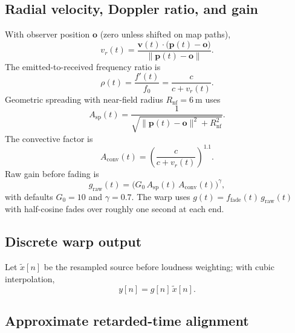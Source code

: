\documentclass{article}
\begin{document}
\subsection{Radial velocity, Doppler ratio, and gain}
\label{supp:radial-doppler-gain}

With observer position $\mathbf{o}$ (zero unless shifted on map paths),
\begin{equation}
  v_r(t) = \frac{\mathbf{v}(t)\cdot\bigl(\mathbf{p}(t)-\mathbf{o}\bigr)}{\bigl\|\mathbf{p}(t)-\mathbf{o}\bigr\|}.
\end{equation}
The emitted-to-received frequency ratio is
\begin{equation}
  \rho(t) = \frac{f'(t)}{f_0} = \frac{c}{c + v_r(t)}.
  \label{eq:doppler-ratio-main}
\end{equation}
Geometric spreading with near-field radius $R_{\mathrm{nf}}=\SI{6}{\meter}$ uses
\begin{equation}
  A_{\mathrm{sp}}(t) = \frac{1}{\sqrt{\bigl\|\mathbf{p}(t)-\mathbf{o}\bigr\|^2 + R_{\mathrm{nf}}^2}}.
\end{equation}
The convective factor is
\begin{equation}
  A_{\mathrm{conv}}(t) = \left(\frac{c}{c+v_r(t)}\right)^{1.1}.
\end{equation}
Raw gain before fading is
\begin{equation}
  g_{\mathrm{raw}}(t) = \bigl(G_0\, A_{\mathrm{sp}}(t)\, A_{\mathrm{conv}}(t)\bigr)^{\gamma},
  \label{eq:gain-raw}
\end{equation}
with defaults $G_0 = 10$ and $\gamma = 0.7$.
The warp uses $g(t) = f_{\mathrm{fade}}(t)\, g_{\mathrm{raw}}(t)$ with half-cosine fades over roughly one second at each end.

\subsection{Discrete warp output}

Let $\tilde{x}[n]$ be the resampled source before loudness weighting; with cubic interpolation,
\begin{equation}
  y[n] = g[n]\, \tilde{x}[n].
  \label{eq:warp-output}
\end{equation}

\subsection{Approximate retarded-time alignment}
\end{document}
